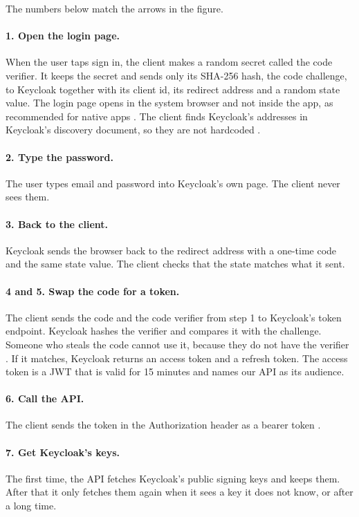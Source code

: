 \documentclass[a4paper,11pt]{article}
\begin{document}
The numbers below match the arrows in the figure.

\paragraph{1. Open the login page.} When the user taps sign in, the client makes a random secret called the code verifier. It keeps the secret and sends only its SHA-256 hash, the code challenge, to Keycloak together with its client id, its redirect address and a random state value. The login page opens in the system browser and not inside the app, as recommended for native apps \cite[sec.~8.12]{ietf-rfc8252-native-apps}. The client finds Keycloak's addresses in Keycloak's discovery document, so they are not hardcoded \cite{openid-connect-discovery}.

\paragraph{2. Type the password.} The user types email and password into Keycloak's own page. The client never sees them.

\paragraph{3. Back to the client.} Keycloak sends the browser back to the redirect address with a one-time code and the same state value. The client checks that the state matches what it sent.

\paragraph{4 and 5. Swap the code for a token.} The client sends the code and the code verifier from step 1 to Keycloak's token endpoint. Keycloak hashes the verifier and compares it with the challenge. Someone who steals the code cannot use it, because they do not have the verifier \cite[sec.~1]{ietf-rfc7636-pkce}. If it matches, Keycloak returns an access token and a refresh token. The access token is a JWT that is valid for 15 minutes and names our API as its audience.

\paragraph{6. Call the API.} The client sends the token in the Authorization header as a bearer token \cite[sec.~2.1]{ietf-rfc6750-bearer}.

\paragraph{7. Get Keycloak's keys.} The first time, the API fetches Keycloak's public signing keys and keeps them. After that it only fetches them again when it sees a key it does not know, or after a long time.
\end{document}
